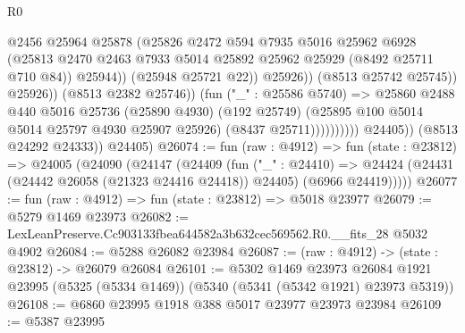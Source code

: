 \begin{lexlean}{R0}
\begin{coremodule}
                                            @2456
                                            @25964
                                            @25878
                                            (@25826
                                              @2472
                                              @594
                                              @7935
                                              @5016
                                              @25962
                                              @6928
                                              (@25813
                                                @2470
                                                @2463
                                                @7933
                                                @5014
                                                @25892
                                                @25962
                                                @25929
                                                (@8492 @25711 @710 @84))
                                              @25944))
                                          (@25948 @25721 @22))
                                        @25926))
                                    (@8513 @25742 @25745))
                                  @25926))
                              (@8513 @2382 @25746))
                            (fun ("_" : @25586 @5740) =>
                            @25860
                              @2488
                              @440
                              @5016
                              @25736
                              (@25890 @4930)
                              (@192 @25749)
                              (@25895 @100 @5014 @5014 @25797 @4930 @25907 @25926)
                              (@8437 @25711))))))))))
            @24405))
        (@8513 @24292 @24333))
      @24405)
@26074 := fun (raw : @4912) =>
  fun (state : @23812) =>
  @24005
    (@24090
      (@24147
        (@24409
          (fun ("_" : @24410) =>
          @24424 (@24431 (@24442 @26058 (@21323 @24416 @24418)) @24405) (@6966 @24419)))))
@26077 := fun (raw : @4912) => fun (state : @23812) => @5018 @23977
@26079 := @5279 @1469 @23973
@26082 := LexLeanPreserve.Cc903133fbea644582a3b632cec569562.R0.__fits_28 @5032 @4902
@26084 := @5288 @26082 @23984
@26087 := (raw : @4912) -> (state : @23812) -> @26079 @26084
@26101 := @5302
    @1469
    @23973
    @26084
    @1921
    @23995
    (@5325 (@5334 @1469))
    (@5340 (@5341 (@5342 @1921) @23973 @5319))
@26108 := @6860 @23995 @1918 @388 @5017 @23977 @23973 @23984
@26109 := @5387 @23995

\end{coremodule}
\end{lexlean}
